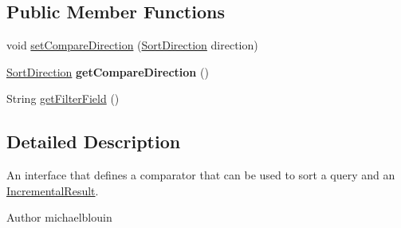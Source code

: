 \subsection*{Public Member Functions}
\begin{DoxyCompactItemize}
\item 
void \hyperlink{interfacecom_1_1ualberta_1_1team17_1_1datamanager_1_1_i_item_comparator_a0b9d08c968368f999963587a519d71e1}{set\+Compare\+Direction} (\hyperlink{enumcom_1_1ualberta_1_1team17_1_1datamanager_1_1_i_item_comparator_1_1_sort_direction}{Sort\+Direction} direction)
\item 
\hypertarget{interfacecom_1_1ualberta_1_1team17_1_1datamanager_1_1_i_item_comparator_a89f62fd2e381e30f6e50d1404afe71c9}{\hyperlink{enumcom_1_1ualberta_1_1team17_1_1datamanager_1_1_i_item_comparator_1_1_sort_direction}{Sort\+Direction} {\bfseries get\+Compare\+Direction} ()}\label{interfacecom_1_1ualberta_1_1team17_1_1datamanager_1_1_i_item_comparator_a89f62fd2e381e30f6e50d1404afe71c9}

\item 
String \hyperlink{interfacecom_1_1ualberta_1_1team17_1_1datamanager_1_1_i_item_comparator_a1d812269d1723e876e7b8d75912acd65}{get\+Filter\+Field} ()
\end{DoxyCompactItemize}


\subsection{Detailed Description}
An interface that defines a comparator that can be used to sort a query and an \hyperlink{classcom_1_1ualberta_1_1team17_1_1datamanager_1_1_incremental_result}{Incremental\+Result}.

\begin{DoxyAuthor}{Author}
michaelblouin 
\end{DoxyAuthor}



